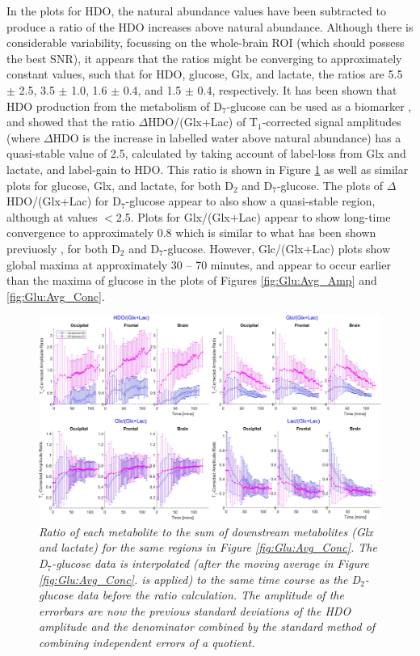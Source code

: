 \documentclass[class=article, crop=false]{standalone}
\begin{document}
In the plots for HDO, the natural abundance values have been subtracted to produce a ratio of the HDO increases above natural abundance. Although there is considerable variability, focussing on the whole-brain ROI (which should possess the best SNR), it appears that the ratios might be converging to approximately constant values, such that for HDO, glucose, Glx, and lactate, the ratios are 5.5 $\pm$ 2.5, 3.5 $\pm$ 1.0, 1.6 $\pm$ 0.4, and 1.5 $\pm$ 0.4, respectively. It has been shown that HDO production from the metabolism of D$_7$-glucose can be used as a biomarker \cite{Mahar2021DeuteratedGlucose}, and showed that the ratio $\Delta$HDO/(Glx+Lac) of T$_1$-corrected signal amplitudes (where $\Delta$HDO is the increase in labelled water above natural abundance) has a quasi-stable value of 2.5, calculated by taking account of label-loss from Glx and lactate, and label-gain to HDO. This ratio is shown in Figure \ref{fig:Glu:HDO_Rat} as well as similar plots for glucose, Glx, and lactate, for both D$_2$ and D$_7$-glucose. The plots of $\Delta$HDO/(Glx+Lac) for D$_7$-glucose appear to also show a quasi-stable region, although at values $<$2.5. Plots for Glx/(Glx+Lac) appear to show long-time convergence to approximately 0.8 which is similar to what has been shown previuosly \cite{Kaggie2022DeuteriumMetabolism}, for both D$_2$ and D$_7$-glucose. However, Glc/(Glx+Lac) plots show global maxima at approximately 30 – 70 minutes, and appear to occur earlier than the maxima of glucose in the plots of Figures \ref{fig:Glu:Avg_Amp} and \ref{fig:Glu:Avg_Conc}.  

\begin{figure}
    \centering
    \includegraphics[width = 1\textwidth]{Figures/Glucose/HDO_Ratio.png}
    \caption{\textit{Ratio of each metabolite to the sum of downstream metabolites (Glx and lactate) for the same regions in Figure \ref{fig:Glu:Avg_Conc}. The D$_7$-glucose data is interpolated (after the moving average in Figure \ref{fig:Glu:Avg_Conc}. is applied) to the same time course as the D$_2$-glucose data before the ratio calculation. The amplitude of the errorbars are now the previous standard deviations of the HDO amplitude and the denominator combined by the standard method of combining independent errors of a quotient.}}
    \label{fig:Glu:HDO_Rat}
\end{figure}
\end{document}
